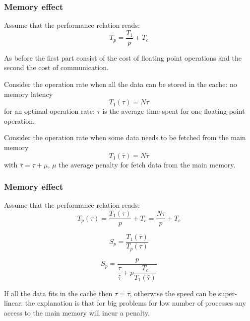 \begin{frame}
  \frametitle{Memory effect}

\medskip
Assume that the performance relation reads:
\begin{equation*}
T_p = \frac{T_1}{p} + T_c
\end{equation*}

\medskip
As before the first part consist of the cost of floating point operations and the second the cost of communication.

\medskip
Consider the operation rate when all the data can be stored in the cache: no memory latency
\begin{equation*}
T_1(\tau) = N \tau
\end{equation*}
for an optimal operation rate: $\tau$ is the average time spent for one floating-point operation.

\medskip
Consider the operation rate when some data needs to be fetched from the main memory
\begin{equation*}
T_1(\bar\tau) = N \bar\tau
\end{equation*}
with $\bar\tau = \tau + \mu$, $\mu$ the average penalty for fetch data from the main memory.

\end{frame}

\begin{frame}
  \frametitle{Memory effect}

\medskip
Assume that the performance relation reads:
\begin{equation*}
T_p(\tau) = \frac{T_1(\tau)}{p} + T_c = \frac{N \tau}{p} + T_c
\end{equation*}

\medskip
\begin{equation*}
S_p = \dfrac{T_1(\bar\tau)}{T_p(\tau)}
\end{equation*}

\medskip
\begin{equation*}
S_p = \dfrac{p}{\dfrac{\tau}{\bar\tau} + p \dfrac{T_c}{T_1(\bar\tau)}}
\end{equation*}

\medskip
If all the data fits in the cache then  $\tau = \bar\tau$, otherwise the speed can be super-linear: the explanation is that for big problems for low number of processes any access to the main memory will incur a penalty.


\end{frame}


